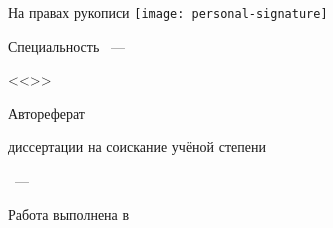 \newcommand{\sfs}{\fontsize{14pt}{15pt}\selectfont}
\sfs %
\thispagestyle{empty}

\vspace{10mm}
\begin{flushright}
  \Large{На правах рукописи}
  \texttt{[image: personal-signature]} 
\end{flushright}

\vspace{30mm}
\begin{center}
{\Large\bf{\thesisAuthor}}
\end{center}

\vspace{30mm}
\begin{center}
{\bf \LARGE \thesisTitle \par}

\vspace{30mm}
{\Large Специальность \thesisSpecialtyNumber~---\par <<\thesisSpecialtyTitle>>}

\vspace{15mm}
\LARGE{Автореферат}\par
\Large{диссертации на соискание учёной степени\par \thesisDegree}
\end{center}

\vspace{40mm}
\begin{center}
{\Large{\thesisCity~--- \thesisYear}}
\end{center}

\newpage
\thispagestyle{empty}
\noindent Работа выполнена в \thesisOrganization

